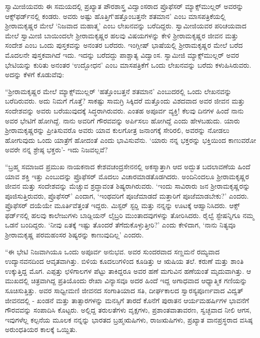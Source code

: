  ಸ್ವಾಮೀಜಿಯವರು ಈ ಸಮಯದಲ್ಲಿ ಪ್ರಖ್ಯಾತ ಪೌರಶಾಸ್ತ್ರ ವಿದ್ವಾಂಸರಾದ ಪ್ರೊಫೆಸರ್ ಮ್ಯಾಕ್ಸ್‌ಮುಲ್ಲರ್ ಅವರನ್ನು ಆಕ್ಸ್​‍ಫರ್ಡ್‍ನಲ್ಲಿ ಕಂಡರು. ಅವರು ಅಷ್ಟು ಹೊತ್ತಿಗೆ\break ‘ಹತ್ತೊಂಬತ್ತನೇ ಶತಮಾನ’ ಎಂಬ ಮಾಸಪತ್ರಿಕೆಯಲ್ಲಿ ಶ‍್ರೀರಾಮಕೃಷ್ಣರ ಮೇಲೆ ‘ನಿಜವಾದ ಮಹಾತ್ಮ’ ಎಂಬ ಲೇಖನವನ್ನು ಬರೆದಿದ್ದರು. ಸ್ವಾಮೀಜಿಯವರ ಪರಿಚಯವಾದ ಮೇಲೆ ಸ್ವಾಮೀಜಿ ಬಾಯಿಂದಲೇ ಶ‍್ರೀರಾಮಕೃಷ್ಣರ ಹಲವು ವಿಷಯಗಳನ್ನು ಕೇಳಿ ಶ‍್ರೀರಾಮಕೃಷ್ಣರ ಜೀವನ ಮತ್ತು ಸಂದೇಶ ಎಂಬ ಒಂದು ಪುಸ್ತಕವನ್ನು ಅನಂತರ ಬರೆದರು. ಇಂಗ್ಲೀಷ್ ಭಾಷೆಯಲ್ಲಿ ಶ‍್ರೀರಾಮಕೃಷ್ಣರ ಮೇಲೆ ಬರೆದ ಮೊದಲನೇ ಪುಸ್ತಕವಾಗಿದೆ ಇದು. ಇದನ್ನು ಬರೆದದ್ದು ಪಾಶ್ಚಾತ್ಯ ವಿದ್ವಾಂಸ. ಸ್ವಾಮೀಜಿ ಮ್ಯಾಕ್ಸ್‌ಮುಲ್ಲರ್ ಅವರ ಭೇಟಿಯನ್ನು ಕುರಿತು ಅನಂತರ ‘ಉದ್ಬೋಧನ’ ಎಂಬ ಮಾಸಪತ್ರಿಕೆಗೆ ಒಂದು ಲೇಖನವನ್ನು ಬರೆದು ಕಳುಹಿಸಿರುವರು. ಅದನ್ನು ಕೆಳಗೆ ಕೊಡುವೆವು: 

 “ಶ‍್ರೀರಾಮಕೃಷ್ಣರ ಮೇಲೆ ಮ್ಯಾಕ್ಸ್‌ಮುಲ್ಲರ್ ‘ಹತ್ತೊಂಬತ್ತನೆ ಶತಮಾನ’ ಎಂಬುದರಲ್ಲಿ ಒಂದು ಲೇಖನವನ್ನು ಬರೆದಿರುವರು. ಅದು ನಿಮಗೆ ಗೊತ್ತೆ? ಸಾಕಷ್ಟು ಸಾಮಗ್ರಿ ಸಿಕ್ಕಿದರೆ ಮತ್ತೊಂದು ವಿಶದವಾದ ಅವರ ಜೀವನ ಮತ್ತು ಸಂದೇಶವನ್ನು ಅವರು ಬರೆಯುವುದಕ್ಕೆ ಸಿದ್ಧರಾಗಿರುವರು. ಎಂತಹ ಅಪೂರ್ವ ವ್ಯಕ್ತಿ! ಕೆಲವು ದಿನಗಳ ಹಿಂದೆ ನಾನು ಅವರ ಭೇಟಿಗೆ ಹೋಗಿದ್ದೆ. ನಾನು ಅವರಿಗೆ ಗೌರವವನ್ನು ಅರ್ಪಿಸಲು ಹೋಗಿದ್ದೆ ಎಂದು ಹೇಳಬಹುದು. ಯಾರು ಶ‍್ರೀರಾಮಕೃಷ್ಣರನ್ನು ಪ್ರೀತಿಸುವರೊ ಅವರು ಯಾವ ಕುಲಗೋತ್ರ ಜನಾಂಗಕ್ಕೆ ಸೇರಿರಲಿ, ಅವರನ್ನು ನೋಡಲು ಹೋಗುವುದು ಒಂದು ಯಾತ್ರೆಗೆ ಹೋದಂತೆ ಎಂದು ಭಾವಿಸುವೆನು. ‘ಯಾರು ನನ್ನ ಭಕ್ತರನ್ನು ಭಕ್ತಿಯಿಂದ ಕಾಣುವರೋ ಅವರೇ ನನ್ನ ಶ್ರೇಷ್ಠ ಭಕ್ತರು’- ಇದು ನಿಜವಲ್ಲವೆ? 

 “ಬ್ರಹ್ಮ ಸಮಾಜದ ಪ್ರಮುಖ ನಾಯಕನಾದ ಕೇಶವಚಂದ್ರಸೇನನಲ್ಲಿ ಅಕಸ್ಮಾತ್ತಾಗಿ ಆದ ಅದ್ಭುತ ಬದಲಾವಣೆಯ ಹಿಂದೆ ಯಾವ ಶಕ್ತಿ ಇತ್ತು ಎಂಬುದನ್ನು ಪ್ರೊಫೆಸರ್ ಮೊದಲು ವಿಚಾರಮಾಡತೊಡಗಿದರು. ಅಂದಿನಿಂದಲೂ ಶ‍್ರೀರಾಮಕೃಷ್ಣರ ಜೀವನ ಮತ್ತು ಸಂದೇಶವನ್ನು ಮೆಚ್ಚುವ ಶ್ರದ್ಧಾವಂತ ಶಿಷ್ಯರಾಗಿರುವರು. ‘ಇಂದು ಸಾವಿರಾರು ಜನ ಶ‍್ರೀರಾಮಕೃಷ್ಣರನ್ನು ಪೂಜಿಸುತ್ತಿರುವರು, ಪ್ರೊಫೆಸರ್’ ಎಂದಾಗ, ‘ಇಂಥವರಿಗೆ ಪೂಜೆಮಾಡದೆ ಮತ್ತಾರಿಗೆ ಪೂಜೆಮಾಡಬೇಕು?’ ಎಂದರು. ಪ್ರೊಫೆಸರ್ ದಯೆಯೇ ಮೂರ್ತಿವೆತ್ತಂತೆ ಇದ್ದರು. ಮಿಸ್ಟರ್ ಸ್ಟರ‍್ಡಿ ಮತ್ತು ನನ್ನನ್ನು ಊಟಕ್ಕೆ ಆಹ್ವಾನಿಸಿದರು. ಆಕ್ಸ್​‍ಫರ್ಡ್‍ನಲ್ಲಿ ಹಲವು ಕಾಲೇಜುಗಳು ಬಾಡ್ಲಿಯನ್ ಲೈಬ್ರರಿ ಮುಂತಾದವುಗಳನ್ನು ತೋರಿಸಿದರು. ರೈಲ್ವೆ ಸ್ಟೇಷನ್ನಿಗೂ ನಮ್ಮ ಒಡನೆ ಬಂದಿದ್ದರು. ‘ನೀವು ಏತಕ್ಕೆ ಇಷ್ಟು ತೊಂದರೆ ತೆಗೆದುಕೊಳ್ಳುತ್ತೀರಿ?’ ಎಂದು ಕೇಳಿದಾಗ, ‘ನಾನು ನಿತ್ಯವೂ ಶ‍್ರೀರಾಮಕೃಷ್ಣ ಪರಮಹಂಸರ ಶಿಷ್ಯರನ್ನು ಕಾಣುವುದಿಲ್ಲ’ ಎಂದರು. 

 “ಈ ಭೇಟಿ ನಿಜವಾಗಿಯೂ ಒಂದು ಅಪೂರ್ವ ಅನುಭವ. ಅವರ ಸುಂದರವಾದ ಸಣ್ಣಮನೆ ರಮ್ಯವಾದ ಉದ್ಯಾನವನದಿಂದ ಆವೃತವಾಗಿತ್ತು. ಬಿಳಿಯ ಕೂದಲುಗಳಿಂದ ಕೂಡಿತ್ತು ಆ ಋಷಿಯ ತಲೆ. ಕರುಣೆ ಮತ್ತು ಶಾಂತಿ ಉಕ್ಕುತ್ತಿದ್ದ ಮೊಗ. ಎಪ್ಪತ್ತು ಛಳಿಗಾಲಗಳ ಪೆಟ್ಟು ತಾಕಿದ್ದರೂ ಅವರ ಹಣೆ ಮಗುವಿನ ಹಣೆಯಂತೆ ಮೃದುವಾಗಿತ್ತು. ಆ ಮುಖದಲ್ಲಿ ಚಿತ್ರವಾಗಿದ್ದ ಪ್ರತಿಯೊಂದು ರೇಖಾ ವಿನ್ಯಾಸವೂ ಅದರ ಹಿಂದೆ ಇದ್ದ ಅಗಾಧವಾದ ಆಧ್ಯಾತ್ಮಿಕ ಗಣಿಯನ್ನು ಸೂಚಿಸುತ್ತಿತ್ತು. ಅವರ ಸಾಧ್ವೀಮಣಿ ಜೀವನದ ಸಂಗಾತಿಯಾದ ಸತಿ, ದೀರ್ಘಕಾಲದ ಸ್ವಾರಸ್ಯಪೂರ್ಣವಾದ ವಿದ್ವತ್ ಜೀವನದಲ್ಲಿ - ಖಂಡನೆ ಮತ್ತು ತಾತ್ಸಾರಗಳನ್ನು ಮನಸ್ಸಿಗೆ ತಾರದೆ ಕೊನೆಗೆ ಪುರಾತನ ಆರ್ಯಮಹರ್ಷಿಗಳ ಭಾವನೆಗೆ ಗೌರವವನ್ನು ಸಂಪಾದಿಸಿ ಕೊಟ್ಟರು. ಅಲ್ಲಿದ್ದ ತರುಲತೆಗಳು ವೃಕ್ಷಗಳು, ಪ್ರಶಾಂತವಾತಾವರಣ, ಸ್ವಚ್ಛವಾದ ನೀಲಿ ಆಗಸ, ಇವುಗಳೆಲ್ಲ ಕಲ್ಪನೆಯ ಮೂಲಕ ನನ್ನನ್ನು ಭಾರತದ ಬ್ರಹ್ಮಋಷಿಗಳು, ರಾಜಋಷಿಗಳು, ಪ್ರಖ್ಯಾತ ವಾನಪ್ರಸ್ಥರಾದ ವಸಿಷ್ಠ ಅರುಂಧತಿಯರ ಕಾಲಕ್ಕೆ ಒಯ್ದಿತು.

